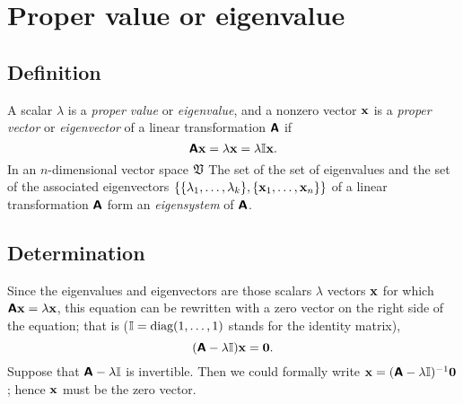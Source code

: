 \section{Proper value or eigenvalue}

\subsection{Definition}

A scalar $\lambda$ is a {\em proper value} or {\em eigenvalue},
and a nonzero vector ${\bf x}$ is a {\em proper vector} or {\em eigenvector}
of a linear transformation $\textsf{\textbf{A}}$
if
\begin{equation}
\textsf{\textbf{A}}{\bf x}=   \lambda {\bf x} =   \lambda {\Bbb I} {\bf x}.
\end{equation}
In an $n$-dimensional
vector space $\frak V$
The set of the set of eigenvalues and the set of the associated eigenvectors
$\{\{\lambda_1,\ldots ,\lambda_k\},\{{\bf x}_1,\ldots ,{\bf x}_n\}\}$
of a linear transformation $\textsf{\textbf{A}}$ form an {\em eigensystem} of $\textsf{\textbf{A}}$.

\subsection{Determination}



Since the eigenvalues and eigenvectors are those scalars $\lambda$  vectors ${\bf x}$ for which $\textsf{\textbf{A}}{\bf x}=   \lambda {\bf x}$,
this equation can be rewritten with a zero vector on the right side of the equation; that is (${\Bbb I}=\textrm{diag}(1,\ldots ,1)$ stands for the identity matrix),
\begin{equation}
(\textsf{\textbf{A}} - \lambda {\Bbb I}){\bf x}= {\bf 0}.
\label{2011-m-eve}
\end{equation}
Suppose that $\textsf{\textbf{A}} - \lambda {\Bbb I}$ is invertible. Then we could formally write
${\bf x} = (\textsf{\textbf{A}} - \lambda {\Bbb I})^{-1}{\bf 0}$; hence ${\bf x}$ must be the zero vector.

